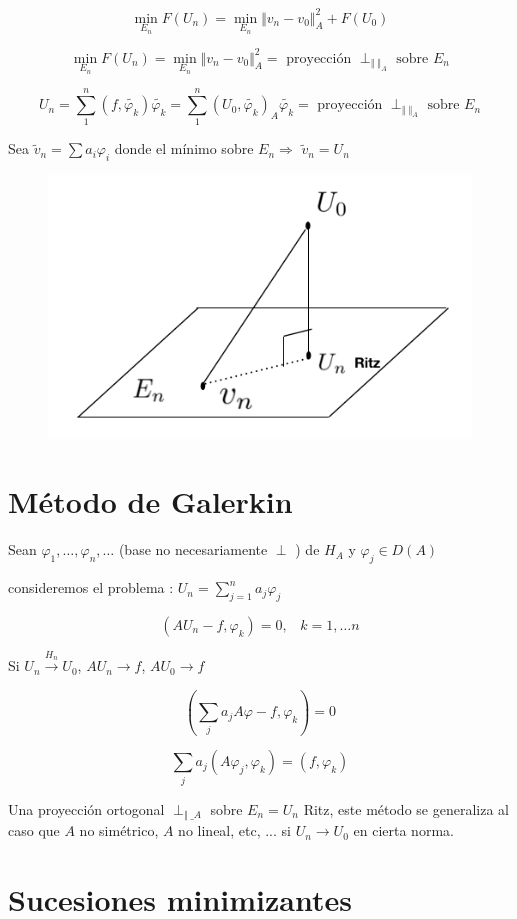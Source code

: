 \documentclass[a4paper,10pt]{book}
\begin{document}
\[
\underset{E_n}{\min }F(U_n) = \underset{E_n}{\min } \Vert v_n -v_0 \Vert_A^2 + F(U_0)
\]

\[
\underset{E_n}{\min }F(U_n) = \underset{E_n}{\min } \Vert v_n -v_0 \Vert_A^2 = \text{ proyección }   \perp_{\Vert\;\Vert_A} \text{ sobre } E_n 
\]

\[U_n = \sum\limits_1^n (f,\tilde{\varphi_k})\tilde{\varphi_k} = \sum\limits_1^n (U_0,\tilde{\varphi_k} )_A \tilde{\varphi_k}  = \text{ proyección }   \perp_{\Vert\;\Vert_A} \text{ sobre } E_n \]

Sea $\tilde{ v}_n = \sum a_i \varphi_i $ donde el mínimo sobre $E_n\Rightarrow$ $\tilde{v}_n= U_n$


\begin{figure}[H]
    \centering
    \includegraphics[width=0.5\linewidth]{Screen Shot 2024-03-14 at 16.38.30.png}
    \caption{}
    \label{fig:5}
\end{figure}


\section{Método de Galerkin}

Sean $\varphi_1,\ldots,\varphi_n,\ldots$ (base no necesariamente $\perp$ ) de $H_A$ y $\varphi_j \in D(A)$

consideremos el problema : $U_n = \sum\limits_{j=1}^n a_j \varphi_j$ 

\[
(A U_n -f, \varphi_k) = 0,\;\;\; k=1,\ldots n
\]

Si $U_n \overset{ H_n}{\rightarrow }  U_0$,  $A U_n \rightarrow f $, $A U_0 \rightarrow f $ 

\[ ( \sum\limits_j a_j A \varphi -f  , \varphi_k ) = 0 \]

\[  \sum\limits_j a_j (A\varphi_j, \varphi_k) = (f,\varphi_k) \]

Una proyección ortogonal $\perp_{\Vert\;\_A}$ sobre $E_n= U_n$ Ritz, este método se generaliza
al caso que $A$ no simétrico, $A$ no lineal, etc, ... si $U_n\rightarrow U_0$ en cierta norma.

\section{Sucesiones minimizantes}
\end{document}

